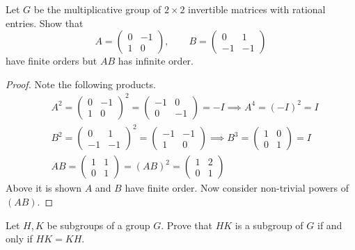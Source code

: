 \documentclass[addpoints,10pt]{exam}
\theoremstyle{plain}
\theoremstyle{definition}
\newtheorem{prob}[thm]{Problem}
\theoremstyle{plain}
\theoremstyle{plain}
\theoremstyle{definition}
\let\oldprob\prob
\let\endoldprob\endprob
\renewenvironment{prob}
  {\begin{singlespace}\oldprob}
  {\endoldprob\end{singlespace}}
\begin{document}
\begin{prob}
  Let $G$ be the multiplicative group of $2\times 2$ invertible matrices with rational entries. Show that
  \[
  A=\begin{pmatrix}0 & -1 \\ 1 & 0\end{pmatrix},
  \qquad
  B=\begin{pmatrix}0 & 1 \\ -1 & -1\end{pmatrix}
  \]
  have finite orders but $AB$ has infinite order.
\end{prob}
\begin{proof} Note the following products.
\begin{align*}
      &A^{2}=\begin{pmatrix}
      0 & -1\\
      1 & 0
    \end{pmatrix}^{2}=\begin{pmatrix}
      -1 & 0\\
      0 & -1
    \end{pmatrix}=-I\implies A^{4}=(-I)^{2}=I\\
      &B^{2}=\begin{pmatrix}0 & 1 \\
      -1 & -1\end{pmatrix}^{2}=\begin{pmatrix}
      -1 & -1 \\
      1 & 0\end{pmatrix}\implies B^{3}=\begin{pmatrix}
      1 & 0 \\
      0 & 1\end{pmatrix}=I\\
      &AB=\begin{pmatrix}
      1 & 1 \\
      0 & 1 \end{pmatrix}=(AB)^{2}=\begin{pmatrix}
      1 & 2 \\
      0 & 1\end{pmatrix} 
\end{align*}
Above it is shown $A$ and $B$ have finite order. Now consider non-trivial powers of $(AB)$.
\end{proof}
\newpage
\setcounter{thm}{9}   %

\begin{prob}
  Let $H,K$ be subgroups of a group $G$. Prove that $HK$ is a subgroup of $G$ if and only if $HK=KH$.
\end{prob}
\end{document}
